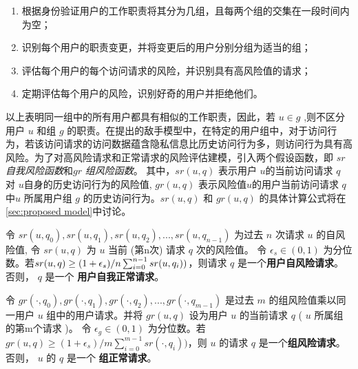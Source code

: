 \begin{enumerate}
	\item 根据身份验证用户的工作职责将其分为几组，且每两个组的交集在一段时间内为空；
	\item 识别每个用户的职责变更，并将变更后的用户分别分组为适当的组；
	\item 评估每个用户的每个访问请求的风险，并识别具有高风险值的请求；
	\item 定期评估每个用户的风险，识别好奇的用户并拒绝他们。
\end{enumerate}

以上表明同一组中的所有用户都具有相似的工作职责，因此，若 $u \in g$ ,则不区分用户 $u$ 和组 $g$ 的职责。在提出的敌手模型中，在特定的用户组中，对于访问行为，若该访问请求的访问数据蕴含隐私信息比历史访问行为多，则访问行为具有高风险。为了对高风险请求和正常请求的风险评估建模，引入两个假设函数，即 $sr$ \emph{自我风险函数}和$gr$ \emph{组风险函数}。 其中，$sr(u,q)$ 表示用户 $u$的当前访问请求 $q$ 对 $u$自身的历史访问行为的风险值,  $gr(u,q)$ 表示风险值$u$的用户当前访问请求 $q$中$u$ 所属用户组 $g$ 的历史访问行为。$sr(u,q)$ 和 $gr(u,q)$ 的具体计算公式将在 \ref{sec:proposed model}中讨论。

\begin{definition}%
	\label{def_self_risky}
	令 $sr(u, q_0), sr(u, q_1), sr(u, q_2), ... ,sr(u, q_{n-1})$ 为过去 $n$ 次请求 $u$ 的自风险值, 令 $sr(u,q)$ 为 $u$ 当前 (第n次) 请求 $q$ 次的风险值。 令 $\epsilon_s \in (0,1)$ 为分位数。若$sr(u,q) \geq  (1+\epsilon_s) / n  \sum ^{n-1}_{i=0}\\{sr(u,q_i))}$，则请求 $q$ 是一个\textbf{用户自风险请求}。否则， $q$ 是一个 \textbf{用户自我正常请求}。
\end{definition}

\begin{definition}%
	\label{def_group_risky}
	令 $gr(\cdot, q_0), gr(\cdot, q_1), gr(\cdot, q_2), ... , gr(\cdot, q_{m-1})$ 是过去 $m$ 的组风险值乘以同一用户 $u$ 组中的用户请求。并将 $gr(u,q)$ 设为用户 $u$ 的当前请求 $q$  ( $u$ 所属组的第m个请求 )。 令 $\epsilon_g \in (0,1)$ 为分位数。若$gr(u,q) \geq  (1+\epsilon_s) / m  \sum ^{m-1}_{i=0}{sr(\cdot,q_i))}$，则 $u$ 的请求 $q$ 是一个\textbf{组风险请求}。否则， $u$ 的 $q$ 是一个 \textbf{组正常请求}。
\end{definition}



